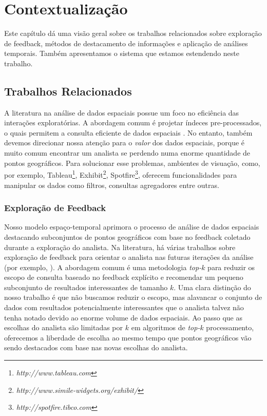 \chapter{Contextualização}
\label{chap:contextualizacao}

Este capítulo dá uma visão geral sobre os trabalhos relacionados sobre exploração de feedback, métodos de destacamento de informações e aplicação de análises temporais. Também apresentamos o sistema que estamos estendendo neste trabalho.

\section{Trabalhos Relacionados}

A literatura na análise de dados espaciais possue um foco no eficiência das interações exploratórias. A abordagem comum é projetar índeces pre-processados, o quais permitem a consulta eficiente de dados espaciais \cite{lins2013nanocubes}. No entanto, também devemos direcionar nossa atenção para o {\em valor} dos dados espaciais, porque é muito comum encontrar um analista se perdendo numa enorme quantidade de pontos geográficos. Para solucionar esse problemas, ambientes de visuação, como, por exemplo, Tableau\footnote{\it http://www.tableau.com}, Exhibit\footnote{\it http://www.simile-widgets.org/exhibit/}, Spotfire\footnote{\it  http://spotfire.tibco.com}, oferecem funcionalidades para manipular os dados como filtros, consultas agregadores entre outras.

\subsection{Exploração de Feedback}

Nosso modelo espaço-temporal aprimora o processo de análise de dados espaciais destacando subconjuntos de pontos geográficos com base no feedback coletado durante a exploração do analista. Na literatura, há várias trabalhos sobre exploração de feedback para orientar o analista nas futuras iterações da análise (por exemplo, ). A abordagem comum é uma metodologia {\em top-$k$} para reduzir os escopo de consulta baseado no feedback explícito e recomendar um pequeno subconjunto de resultados interessantes de tamanho $k$. Uma clara distinção do nosso trabalho é que não buscamos reduzir o escopo, mas alavancar o conjunto de dados com resultados potencialmente interessantes que o analista talvez não tenha notado devido ao enorme volume de dados espaciais. Ao passo que as escolhas do analista são limitadas por $k$ em algoritmos de {\em top-$k$} processamento, oferecemos a liberdade de escolha ao mesmo tempo que pontos geográficos vão sendo destacados com base nas novas escolhas do analista.

